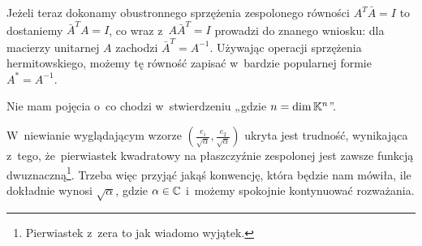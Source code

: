 \documentclass[a4paper,11pt]{article}
\begin{document}
Jeżeli teraz dokonamy obustronnego sprzężenia zespolonego równości
$A^{ T } \bar{A} = I$ to dostaniemy $\bar{A}^{ T } A = I$, co wraz
z~$A \bar{A}^{ T } = I$ prowadzi do znanego wniosku: dla macierzy unitarnej
$A$ zachodzi $\bar{A}^{ T } = A^{ -1 }$. Używając operacji sprzężenia
hermitowskiego, możemy tę równość zapisać w~bardzie popularnej formie
$A^{ * } = A^{ -1 }$.

\vspace{\spaceFour}





\start {} Nie mam pojęcia o~co chodzi w~stwierdzeniu
„gdzie $n = \dim \mathbb{K}^{ n }$”.





\start {} W~niewianie wyglądającym wzorze
$\left( \frac{ e_{ i } }{ \sqrt{ \alpha } }, \frac{ e_{ 2 } }{ \sqrt{ \alpha } } \right)$
ukryta jest trudność, wynikająca z~tego, że~pierwiastek kwadratowy na
płaszczyźnie zespolonej jest zawsze funkcją dwuznaczną\footnote{Pierwiastek
  z~zera to jak wiadomo wyjątek.}. Trzeba więc przyjąć jakąś konwencję,
która będzie nam mówiła, ile dokładnie wynosi $\sqrt{ \alpha }$, gdzie
$\alpha \in \mathbb{C}$ i~możemy spokojnie kontynuować rozważania.































\newpage

\end{document}
